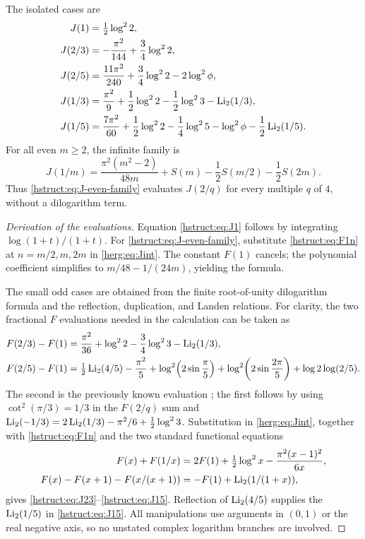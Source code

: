 The isolated cases are
\begin{align}
 J(1)&=\tfrac12\log^22,\label{hstruct:eq:J1}\\
 J(2/3)&=-\frac{\pi^2}{144}+\frac34\log^22,\label{hstruct:eq:J23}\\
 J(2/5)&=\frac{11\pi^2}{240}+\frac34\log^22-2\log^2\phi,
 \label{hstruct:eq:J25}\\
 J(1/3)&=\frac{\pi^2}{9}+\frac12\log^22-\frac12\log^23
          -\operatorname{Li}_2(1/3),\label{hstruct:eq:J13}\\
 J(1/5)&=\frac{7\pi^2}{60}+\frac12\log^22-\frac14\log^25
          -\log^2\phi-\frac12\operatorname{Li}_2(1/5).\label{hstruct:eq:J15}
\end{align}
For all even $m\ge2$, the infinite family is
\begin{equation}\label{hstruct:eq:J-even-family}
 \boxed{\displaystyle
 J(1/m)=\frac{\pi^2(m^2-2)}{48m}
       +S(m)-\frac12S(m/2)-\frac12S(2m).}
\end{equation}
Thus \eqref{hstruct:eq:J-even-family} evaluates $J(2/q)$ for every multiple
$q$ of $4$, without a dilogarithm term.

\begin{proof}[Derivation of the evaluations]
Equation \eqref{hstruct:eq:J1} follows by integrating
$\log(1+t)/(1+t)$. For \eqref{hstruct:eq:J-even-family}, substitute
\eqref{hstruct:eq:F1n} at $n=m/2,m,2m$ in \eqref{herg:eq:Jint}. The constant
$F(1)$ cancels; the polynomial coefficient simplifies to
$m/48-1/(24m)$, yielding the formula.

The small odd cases are obtained from the finite root-of-unity
dilogarithm formula and the reflection, duplication, and Landen
relations. For clarity, the two fractional $F$ evaluations needed in
the calculation can be taken as
\begin{align*}
 F(2/3)-F(1)
  &=\frac{\pi^2}{36}+\log^22-\frac34\log^23-\operatorname{Li}_2(1/3),\\
 F(2/5)-F(1)
  &=\tfrac12\operatorname{Li}_2(4/5)-\frac{\pi^2}{5}
    +\log^2\!\left(2\sin\frac\pi5\right)
    +\log^2\!\left(2\sin\frac{2\pi}5\right)
    +\log2\log(2/5).
\end{align*}
The second is the previously known evaluation \cite{RadchenkoZagier}; the first
follows by using $\cot^2(\pi/3)=1/3$ in the $F(2/q)$ sum and
$\operatorname{Li}_2(-1/3)=2\operatorname{Li}_2(1/3)-\pi^2/6+\tfrac12\log^23$.
Substitution in \eqref{herg:eq:Jint}, together with \eqref{hstruct:eq:F1n} and
the two standard functional equations
\begin{align*}
 F(x)+F(1/x)&=2F(1)+\tfrac12\log^2x
                 -\frac{\pi^2(x-1)^2}{6x},\\
 F(x)-F(x+1)-F(x/(x+1))&=-F(1)+\operatorname{Li}_2(1/(1+x)),
\end{align*}
gives \eqref{hstruct:eq:J23}--\eqref{hstruct:eq:J15}. Reflection of
$\operatorname{Li}_2(4/5)$ supplies the $\operatorname{Li}_2(1/5)$ in \eqref{hstruct:eq:J15}.
All manipulations use arguments in $(0,1)$ or the real negative axis,
so no unstated complex logarithm branches are involved.
\end{proof}

